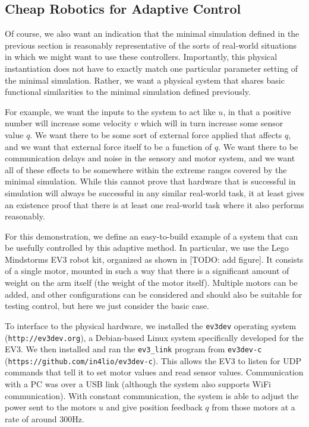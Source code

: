 \documentclass{frontiersSCNS} %
\begin{document}
\subsection{Cheap Robotics for Adaptive Control}

Of course, we also want an indication that the minimal simulation defined
in the previous section is reasonably representative of the sorts of real-world
situations in which we might want to use these controllers.  Importantly, 
this physical instantiation does not have to exactly match one particular
parameter setting of the minimal simulation.  Rather, we want a physical system
that shares basic functional similarities to the minimal simulation defined
previously.

For example, we want the inputs to the system to act like $u$, in that a
positive number will increase some velocity $v$ which will in turn increase some
sensor value $q$.  We want there to be some sort of external force applied that
affects $q$, and we want that external force itself to be a function of $q$.
We want there to be communication delays and noise in the sensory and motor
system, and we want all of these effects to be somewhere within the extreme
ranges covered by the minimal simulation.  While this cannot prove that hardware
that is successful in simulation will always be successful in any similar
real-world task, it at least gives an existence proof that there is at least
one real-world task where it also performs reasonably.

For this demonstration, we define an easy-to-build example of a system that can be usefully controlled
by this adaptive method.  In particular, we use the Lego Mindstorms EV3 robot kit,
organized as shown in [TODO: add figure].  It consists of a single
motor, mounted in such a way that there is a significant amount of weight on
the arm itself (the weight of the motor itself).  Multiple motors can be
added, and other configurations can be considered and should also be suitable
for testing control, but here we just consider the basic case.

To interface to the physical hardware, we installed the \texttt{ev3dev} operating
system (\texttt{http://ev3dev.org}), a Debian-based Linux system specifically developed
for the EV3.  We then installed and ran the \texttt{ev3\_link} program from \texttt{ev3dev-c}
(\texttt{https://github.com/in4lio/ev3dev-c}).  This allows the EV3 to listen for
UDP commands that tell it to set motor values and read sensor values.
Communication with a PC was over a USB link (although the system also
supports WiFi communication).  With constant communication, the system is
able to adjust the power sent to the motors $u$ and give position feedback
$q$ from those motors at a rate of around 300Hz.
\end{document}
